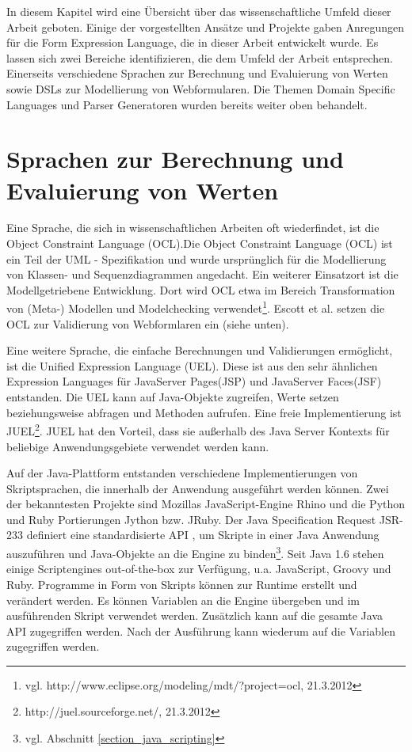 In diesem Kapitel wird eine Über\-sicht über das wissenschaftliche Umfeld dieser Arbeit geboten. Einige der vorgestellten Ansätze und Projekte gaben Anregungen für die Form Expression Language, die in dieser Arbeit entwickelt wurde. Es lassen sich zwei Bereiche identifizieren, die dem Umfeld der Arbeit entsprechen. Einerseits verschiedene Sprachen zur Berechnung und Eva\-lu\-ier\-ung von Werten sowie DSLs zur Modellierung von Webformularen. Die Themen Domain Specific Languages und Parser Generatoren wurden bereits weiter oben behandelt.

\section{Sprachen zur Berechnung und Eva\-lu\-ier\-ung von Werten}

Eine Sprache, die sich in wissenschaftlichen Arbeiten oft wiederfindet, ist die Object Constraint Language (OCL)\cite{RiGo98}.Die Object Constraint Language (OCL) ist ein Teil der UML - Spezifikation und wurde ursprünglich für die Modellierung von Klassen- und Sequenzdiagrammen angedacht. Ein weiterer Einsatzort ist die Modellgetriebene Entwicklung. Dort wird OCL etwa im Bereich Transformation von (Meta-) Modellen und Modelchecking verwendet\footnote{vgl. http://www.eclipse.org/modeling/mdt/?project=ocl, 21.3.2012}. Escott et al.\cite{Esco12} setzen die OCL zur Validierung von Webformlaren ein (siehe unten).

Eine weitere Sprache, die einfache Berechnungen und Validierungen er\-mög\-licht, ist die Unified Expression Language (UEL). Diese ist aus den sehr ähnlichen Expression Languages für JavaServer Pages(JSP) und JavaServer Faces(JSF) entstanden. Die UEL kann auf Java-Objekte zugreifen, Werte setzen be\-zieh\-ungs\-wei\-se abfragen und Methoden aufrufen. Eine freie Implementierung ist JUEL\footnote{http://juel.sourceforge.net/, 21.3.2012}. JUEL hat den Vorteil, dass sie außerhalb des Java Server Kontexts für beliebige Anwendungsgebiete verwendet werden kann.

Auf der Java-Plattform entstanden verschiedene Implementierungen von Skriptsprachen, die innerhalb der Anwendung ausgeführt werden können. Zwei der bekanntesten Projekte sind Mozillas Java\-Script-Engine Rhino\cite{wwwRhino} und die Python und Ruby Portierungen Jython bzw. JRuby. Der Java Specification Request JSR-233 definiert eine standardisierte API \cite{JSR-223}, um Skripte in einer Java Anwendung auszuführen und Java-Objekte an die Engine zu binden\footnote{vgl. Abschnitt \ref{section_java_scripting}}.  Seit Java 1.6 stehen einige Scriptengines out-of-the-box zur Verfügung, u.a. Java\-Script, Groovy und Ruby. Programme in Form von Skripts können zur Runtime erstellt und verändert werden. Es können Variablen an die Engine übergeben und im ausführenden Skript verwendet werden. Zu\-sätz\-lich kann auf die gesamte Java API zugegriffen werden. Nach der Ausführung kann wiederum auf die Variablen zugegriffen werden. 

